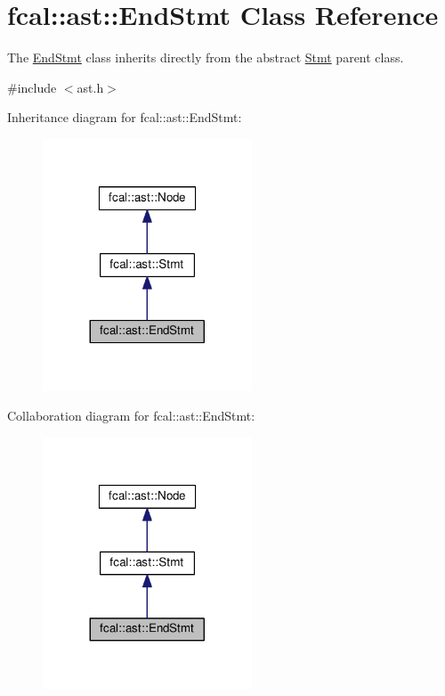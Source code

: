 \hypertarget{classfcal_1_1ast_1_1EndStmt}{}\section{fcal\+:\+:ast\+:\+:End\+Stmt Class Reference}
\label{classfcal_1_1ast_1_1EndStmt}


The \hyperlink{classfcal_1_1ast_1_1EndStmt}{End\+Stmt} class inherits directly from the abstract \hyperlink{classfcal_1_1ast_1_1Stmt}{Stmt} parent class.  




{\ttfamily \#include $<$ast.\+h$>$}



Inheritance diagram for fcal\+:\+:ast\+:\+:End\+Stmt\+:\nopagebreak
\begin{figure}[H]
\begin{center}
\leavevmode
\includegraphics[width=176pt]{classfcal_1_1ast_1_1EndStmt__inherit__graph}
\end{center}
\end{figure}


Collaboration diagram for fcal\+:\+:ast\+:\+:End\+Stmt\+:\nopagebreak
\begin{figure}[H]
\begin{center}
\leavevmode
\includegraphics[width=176pt]{classfcal_1_1ast_1_1EndStmt__coll__graph}
\end{center}
\end{figure}
